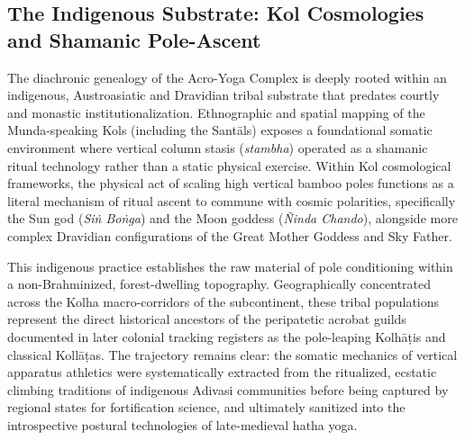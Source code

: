 \documentclass[11pt,twoside,letterpaper]{article}
\begin{document}
\subsection{The Indigenous Substrate: Kol Cosmologies and Shamanic Pole-Ascent}
The diachronic genealogy of the Acro-Yoga Complex is deeply rooted within an indigenous, Austroasiatic and Dravidian tribal substrate that predates courtly and monastic institutionalization. Ethnographic and spatial mapping of the Munda-speaking Kols (including the Santāls) exposes a foundational somatic environment where vertical column stasis (\textit{stambha}) operated as a shamanic ritual technology rather than a static physical exercise. Within Kol cosmological frameworks, the physical act of scaling high vertical bamboo poles functions as a literal mechanism of ritual ascent to commune with cosmic polarities, specifically the Sun god (\textit{Siṅ Boṅga}) and the Moon goddess (\textit{Ñinda Chando}), alongside more complex Dravidian configurations of the Great Mother Goddess and Sky Father.

This indigenous practice establishes the raw material of pole conditioning within a non-Brahminized, forest-dwelling topography. Geographically concentrated across the Kolha macro-corridors of the subcontinent, these tribal populations represent the direct historical ancestors of the peripatetic acrobat guilds documented in later colonial tracking registers as the pole-leaping Kolhāṭis and classical Kollāṭas. The trajectory remains clear: the somatic mechanics of vertical apparatus athletics were systematically extracted from the ritualized, ecstatic climbing traditions of indigenous Adivasi communities before being captured by regional states for fortification science, and ultimately sanitized into the introspective postural technologies of late-medieval hatha yoga.

\end{document}
